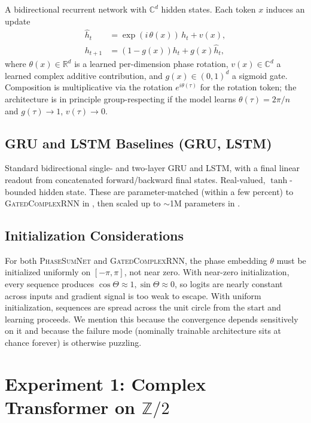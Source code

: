 \documentclass[11pt]{article}
\theoremstyle{definition}
\newcommand{\R}{\mathbb{R}}
\newcommand{\C}{\mathbb{C}}
\newcommand{\Z}{\mathbb{Z}}
\begin{document}
A bidirectional recurrent network with $\C^d$ hidden states. Each
token $x$ induces an update
\begin{align}
\hat{h}_t &= \exp(i\,\theta(x))\, h_t + v(x), \\
h_{t+1} &= (1 - g(x)) h_t + g(x) \hat{h}_t,
\end{align}
where $\theta(x) \in \R^d$ is a learned per-dimension phase rotation,
$v(x) \in \C^d$ a learned complex additive contribution, and
$g(x) \in (0,1)^d$ a sigmoid gate. Composition is multiplicative
via the rotation $e^{i\theta(\tau)}$ for the rotation token; the
architecture is in principle group-respecting if the model learns
$\theta(\tau) = 2\pi/n$ and $g(\tau) \to 1$, $v(\tau) \to 0$.

\subsection{GRU and LSTM Baselines (\textsc{GRU}, \textsc{LSTM})}

Standard bidirectional single- and two-layer GRU and LSTM, with a
final linear readout from concatenated forward/backward final
states. Real-valued, $\tanh$-bounded hidden state. These are
parameter-matched (within a few percent) to \textsc{GatedComplexRNN}
in , then scaled up to $\sim$1M parameters in
.

\subsection{Initialization Considerations}
\label{subsec:init-matters}

For both \textsc{PhaseSumNet} and \textsc{GatedComplexRNN}, the
phase embedding $\theta$ must be initialized uniformly on
$[-\pi, \pi]$, not near zero. With near-zero initialization, every
sequence produces $\cos\Theta \approx 1, \sin\Theta \approx 0$, so
logits are nearly constant across inputs and gradient signal is too
weak to escape. With uniform initialization, sequences are spread
across the unit circle from the start and learning proceeds. We
mention this because the convergence depends sensitively on it and
because the failure mode (nominally trainable architecture sits at
chance forever) is otherwise puzzling.


\section{Experiment 1: Complex Transformer on $\Z/2$}
\label{sec:exp1}
\end{document}
